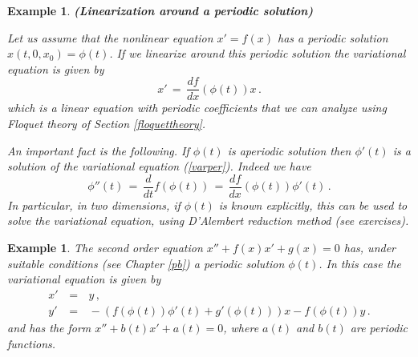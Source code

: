 \documentclass[12pt]{report}
\newtheorem{example}[theorem]{Example}
\newcommand{\nn}{\nonumber}
\def\eqref#1{(\ref{#1})}
\begin{document}
\begin{example}{\bf (Linearization around a periodic solution)}
{\rm Let us assume that the nonlinear equation $x' = f(x)$ has a periodic solution
$x(t,0,x_0)=\phi(t)$. If we linearize around this periodic solution the variational 
equation is given by 
\begin{equation}\label{varper}
x'\,=\, \frac{df}{dx} (\phi(t)) x \,.
\end{equation}
which is a linear equation with periodic coefficients that we can analyze using Floquet 
theory of Section \ref{floquettheory}. 


An important fact is the following. If $\phi(t)$ is  aperiodic solution then  
$\phi'(t)$ is a solution of the variational equation \eqref{varper}. Indeed we have 
\begin{equation}
\phi''(t)\,=\, \frac{d}{dt} f(\phi(t)) \,=\, 
\frac{df}{dx}(\phi(t)) \phi'(t) \,.
\end{equation} 
In particular, in two dimensions, if $\phi(t)$ is known explicitly, 
this can be used to solve the variational  equation, 
using D'Alembert reduction method (see exercises). 
}
\end{example}

\begin{example}{\rm  
The second order equation $x'' + f(x)x' + g(x) =0$ has, under suitable
conditions (see Chapter \ref{pb}) a periodic solution $\phi(t)$. In
this case the variational equation is given by
\begin{eqnarray}
x'\,&=&\, y \,, \nn \\
y'\,&=&\, -\left(f(\phi(t))\phi'(t) +g'(\phi(t))\right)x - f(\phi(t))y\,.
\end{eqnarray}
and has the form $x'' + b(t)x' + a(t) =0$, where $a(t)$ and $b(t)$ are
periodic functions.
}
\end{example}
\end{document}
